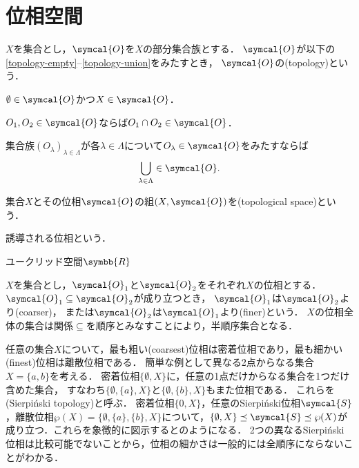 \documentclass{ltjsbook}
\begin{document}
\section{位相空間}
\begin{thmbox}
\begin{definition}
\(X\)を集合とし，\(\symcal{O}\)を\(X\)の部分集合族とする．
\(\symcal{O}\)が以下の\ref{topology-empty}--\ref{topology-union}をみたすとき，
\(\symcal{O}\)の(topology)という．
\begin{conditions}
    \item\label{topology-empty} \(\emptyset \in \symcal{O}\)かつ\(X \in \symcal{O}\)．
    \item\label{topology-intersection} \(O_1, O_2 \in \symcal{O}\)ならば\(O_1 \cap O_2 \in \symcal{O}\)．
    \item\label{topology-union} 集合族\({(O_\lambda)}_{\lambda \in \Lambda}\)が各\(\lambda \in \Lambda\)について\(O_\lambda \in \symcal{O}\)をみたすならば
        \begin{align}
            \bigcup_{\lambda \in \Lambda} \in \symcal{O}.
        \end{align}
\end{conditions}
集合\(X\)とその位相\(\symcal{O}\)の組\(\tuple{X, \symcal{O}}\)を(topological space)という．
\end{definition}
\end{thmbox}

\begin{thmbox}
\begin{definition}
誘導される位相という．
\end{definition}
\end{thmbox}

\begin{exa}
ユークリッド空間\(\symbb{R}\)
\end{exa}

\(X\)を集合とし，\(\symcal{O}_1\)と\(\symcal{O}_2\)をそれぞれ\(X\)の位相とする．
\(\symcal{O}_1 \subseteq \symcal{O}_2\)が成り立つとき，
\(\symcal{O}_1\)は\(\symcal{O}_2\)より(coarser)，
または\(\symcal{O}_2\)は\(\symcal{O}_1\)より(finer)という．
\(X\)の位相全体の集合は関係\(\subseteq\)を順序とみなすことにより，半順序集合となる．

任意の集合\(X\)について，最も粗い(coarsest)位相は密着位相であり，最も細かい(finest)位相は離散位相である．
簡単な例として異なる2点からなる集合\(X = \{a, b\}\)を考える．
密着位相\(\{\emptyset, X\}\)に，任意の1点だけからなる集合を1つだけ含めた集合，
すなわち\(\{\emptyset, \{a\}, X\}\)と\(\{\emptyset, \{b\}, X\}\)もまた位相である．
これらを(Sierpiński topology)と呼ぶ．
密着位相\(\{0, X\}\)，任意のSierpiński位相\(\symcal{S}\)，離散位相\(\wp(X) = \{\emptyset, \{a\}, \{b\}, X\}\)について，\(\{\emptyset, X\} \preceq \symcal{S} \preceq \wp(X)\)が成り立つ．これらを象徴的に図示するとのようになる．
2つの異なるSierpiński位相は比較可能でないことから，位相の細かさは一般的には全順序にならないことがわかる．
\end{document}
